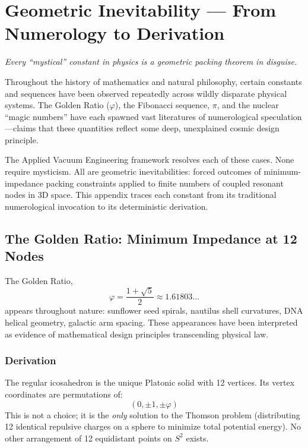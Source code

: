 \chapter{Geometric Inevitability --- From Numerology to Derivation}
\label{app:geometric_inevitability}

\textit{Every ``mystical'' constant in physics is a geometric packing theorem in disguise.}

\vspace{1em}

Throughout the history of mathematics and natural philosophy, certain constants and sequences have been observed repeatedly across wildly disparate physical systems. The Golden Ratio ($\varphi$), the Fibonacci sequence, $\pi$, and the nuclear ``magic numbers'' have each spawned vast literatures of numerological speculation---claims that these quantities reflect some deep, unexplained cosmic design principle.

The Applied Vacuum Engineering framework resolves each of these cases. None require mysticism. All are geometric inevitabilities: forced outcomes of minimum-impedance packing constraints applied to finite numbers of coupled resonant nodes in 3D space. This appendix traces each constant from its traditional numerological invocation to its deterministic derivation.

\section{The Golden Ratio: Minimum Impedance at 12 Nodes}
\label{sec:golden_ratio_emergence}

The Golden Ratio,
\begin{equation}
    \varphi = \frac{1 + \sqrt{5}}{2} \approx 1.61803\ldots
\end{equation}
appears throughout nature: sunflower seed spirals, nautilus shell curvatures, DNA helical geometry, galactic arm spacing. These appearances have been interpreted as evidence of mathematical design principles transcending physical law.

\subsection{Derivation}
The regular icosahedron is the unique Platonic solid with 12 vertices. Its vertex coordinates are permutations of:
\begin{equation}
    (0, \pm 1, \pm \varphi)
\end{equation}
This is not a choice; it is the \textit{only} solution to the Thomson problem (distributing 12 identical repulsive charges on a sphere to minimize total potential energy). No other arrangement of 12 equidistant points on $S^2$ exists.

